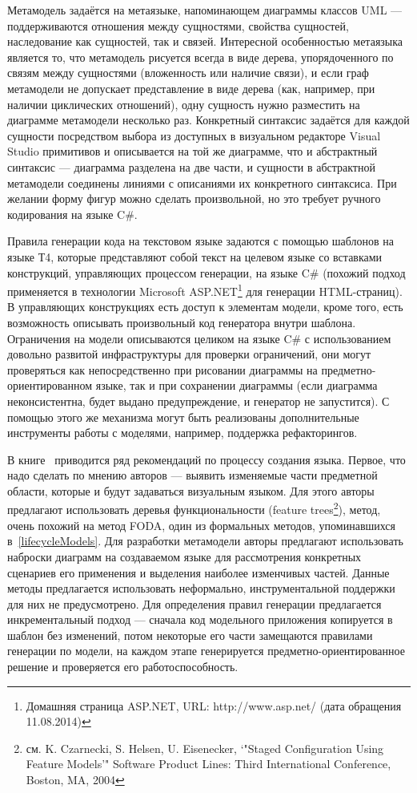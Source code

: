 Метамодель задаётся на метаязыке, напоминающем диаграммы классов UML --- поддерживаются
отношения между сущностями, свойства сущностей, наследование как сущностей, так и связей.
Интересной особенностью метаязыка является то, что метамодель рисуется всегда в виде дерева,
упорядоченного по связям между сущностями (вложенность или наличие связи), и если граф метамодели
не допускает представление в виде дерева (как, например, при наличии циклических отношений),
одну сущность нужно разместить на диаграмме метамодели несколько раз. Конкретный синтаксис
задаётся для каждой сущности посредством выбора из доступных в визуальном редакторе Visual Studio
примитивов и описывается на той же диаграмме, что и абстрактный синтаксис --- диаграмма
разделена на две части, и сущности в абстрактной метамодели соединены линиями с описаниями их конкретного синтаксиса.
При желании форму фигур можно сделать произвольной, но это требует ручного кодирования на языке C\#.

Правила генерации кода на текстовом языке задаются с помощью шаблонов на языке Т4, которые
представляют собой текст на целевом языке со вставками конструкций, управляющих процессом 
генерации, на языке C\# (похожий подход применяется в технологии Microsoft ASP.NET\footnote
{Домашняя страница ASP.NET, URL: http://www.asp.net/ (дата обращения 11.08.2014)}
для генерации HTML-страниц). В управляющих конструкциях есть доступ к элементам модели, кроме того,
есть возможность описывать произвольный код генератора внутри шаблона. Ограничения на модели
описываются целиком на языке C\# с использованием довольно развитой инфраструктуры для
проверки ограничений, они могут проверяться как непосредственно при рисовании диаграммы
на предметно-ориентированном языке, так и при сохранении диаграммы (если диаграмма 
неконсистентна, будет выдано предупреждение, и генератор не запустится). С помощью этого
же механизма могут быть реализованы дополнительные инструменты работы с моделями, например,
поддержка рефакторингов.

В книге~\cite{cook2007domain} приводится ряд рекомендаций по процессу создания языка.
Первое, что надо сделать по мнению авторов --- выявить изменяемые части предметной области,
которые и будут задаваться визуальным языком. Для этого авторы предлагают использовать
деревья функциональности (feature trees\footnote{см. K. Czarnecki, S. Helsen, U. Eisenecker, `"Staged Configuration
Using Feature Models'" Software Product Lines: Third International Conference, Boston, MA, 2004}),
метод, очень похожий на метод FODA, один из формальных методов, упоминавшихся в~\ref{lifecycleModels}.
Для разработки метамодели авторы предлагают использовать наброски диаграмм на создаваемом языке
для рассмотрения конкретных сценариев его применения и выделения наиболее изменчивых частей.
Данные методы предлагается использовать неформально, инструментальной поддержки для них не предусмотрено.
Для определения правил генерации предлагается инкрементальный подход --- сначала код модельного
приложения копируется в шаблон без изменений, потом некоторые его части замещаются правилами генерации
по модели, на каждом этапе генерируется предметно-ориентированное решение и проверяется
его работоспособность.

